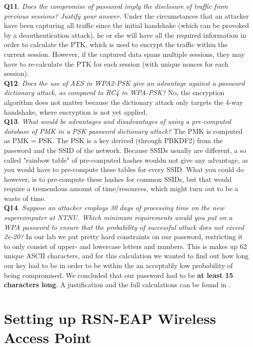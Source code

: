 \documentclass[a4paper,11pt]{article}
\begin{document}
\noindent\textbf{Q11}. \textit{Does the compromise of password imply the disclosure of traffic from previous sessions? Justify your answer.} Under the circumstances that an attacker have been capturing all traffic since the initial handshake (which can be provoked by a deauthentication attack), he or she will have all the required information in order to calculate the PTK, which is used to encrypt the traffic within the current session. However, if the captured data spans multiple sessions, they may have to re-calculate the PTK for each session (with unique nonces for each session).\\

\noindent\textbf{Q12}. \textit{Does the use of AES in WPA2-PSK give an advantage against a password dictionary attack, as compared to RC4 in WPA-PSK?} No, the encryption algorithm does not matter because the dictionary attack only targets the 4-way handshake, where encryption is not yet applied. \\

\noindent\textbf{Q13}. \textit{What would be advantages and disadvantages of using a pre-computed database of PMK in a PSK password dictionary attack?} The PMK is computed as PMK = PSK. The PSK is a key derived (through PBKDF2) from the password and the SSID of the network. Because SSIDs usually are different, a so called "rainbow table" of pre-computed hashes wouldn not give any advantage, as you would have to pre-compute these tables for every SSID. What you could do however, is to pre-compute these hashes for common SSIDs, but that would require a tremendous amount of time/resources, which might turn out to be a waste of time.\\

\noindent\textbf{Q14}. \textit{Suppose an attacker employs 30 days of processing time on the new supercomputer at NTNU. Which minimum requirements would you put on a WPA password to ensure that the probability of successful attack does not exceed 2e-20?} In our lab we put pretty hard constraints on our password, restricting it to only consist of upper- and lowercase letters and numbers. This is makes up 62 unique ASCII characters, and for this calculation we wanted to find out how long our key had to be in order to be within the an acceptably low probability of being compromised. We concluded that our password had to be \textbf{at least 15 characters long}. A justification and the full calculations can be found in .

\section{Setting up RSN-EAP Wireless Access Point}
\end{document}
